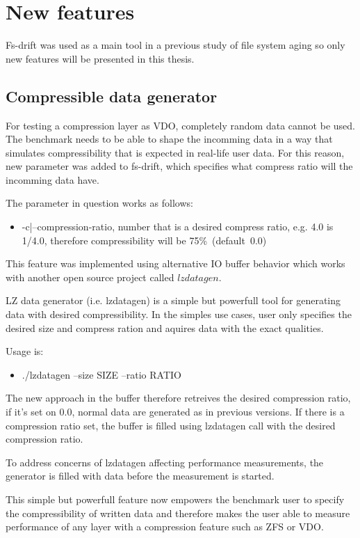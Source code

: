 \documentclass[
  color, %
  table, %
  lof,   %
  lot,   %
]{fithesis3}
\begin{document}
\section{New features}
Fs-drift was used as a main tool in a previous study of file system aging so only new features will be presented in this thesis.

\subsection{Compressible data generator}
For testing a compression layer as VDO, completely random data cannot be used. The benchmark needs to be able to shape the incomming data in a way that simulates compressibility that is expected in real-life user data. For this reason, new parameter was added to fs-drift, which specifies what compress ratio will the incomming data have.

The parameter in question works as follows:
\begin{itemize}
    \item -c|--compression-ratio, number that is a desired compress ratio, e.g. 4.0 is 1/4.0, therefore compressibility will be 75\%~(default~0.0)
\end{itemize}

This feature was implemented using alternative IO buffer behavior which works with another open source project called $lzdatagen$.

LZ data generator (i.e. lzdatagen) is a simple but powerfull tool for generating data with desired compressibility. In the simples use cases, user only specifies the desired size and compress ration and aquires data with the exact qualities.

Usage is:
\begin{itemize}
    \item ./lzdatagen --size SIZE --ratio RATIO
\end{itemize}

The new approach in the buffer therefore retreives the desired compression ratio, if it's set on 0.0, normal data are generated as in previous versions. If there is a compression ratio set, the buffer is filled using lzdatagen call with the desired compression ratio.

To address concerns of lzdatagen affecting performance measurements, the generator is filled with data before the measurement is started.

This simple but powerfull feature now empowers the benchmark user to specify the compressibility of written data and therefore makes the user able to measure performance of any layer with a compression feature such as ZFS or VDO.
\end{document}
